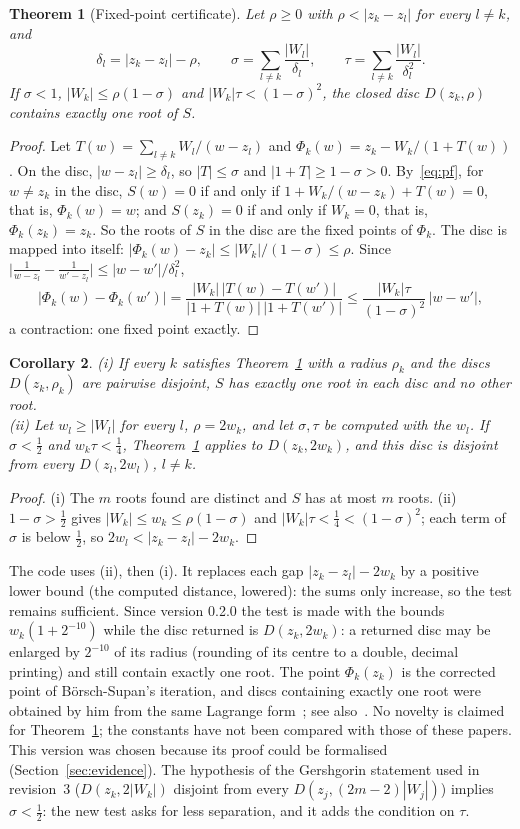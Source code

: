 \documentclass[10pt,a4paper]{article}
\newtheorem{theorem}{Theorem}[section]
\newtheorem{corollary}[theorem]{Corollary}
\theoremstyle{definition}
\numberwithin{equation}{section}
\begin{document}
\begin{theorem}[Fixed-point certificate]\label{thm:fp}
Let $\rho\ge0$ with $\rho<|z_k-z_l|$ for every $l\ne k$, and
\[
\delta_l=|z_k-z_l|-\rho,\qquad\sigma=\sum_{l\ne k}\frac{|W_l|}{\delta_l},\qquad
\tau=\sum_{l\ne k}\frac{|W_l|}{\delta_l^2}.
\]
If $\sigma<1$, $|W_k|\le\rho(1-\sigma)$ and $|W_k|\tau<(1-\sigma)^2$, the closed disc $D(z_k,\rho)$
contains exactly one root of $S$.
\end{theorem}
\begin{proof}
Let $T(w)=\sum_{l\ne k}W_l/(w-z_l)$ and $\Phi_k(w)=z_k-W_k/(1+T(w))$. On the disc, $|w-z_l|\ge\delta_l$,
so $|T|\le\sigma$ and $|1+T|\ge1-\sigma>0$. By~\eqref{eq:pf}, for $w\ne z_k$ in the disc, $S(w)=0$ if
and only if $1+W_k/(w-z_k)+T(w)=0$, that is, $\Phi_k(w)=w$; and $S(z_k)=0$ if and only if $W_k=0$,
that is, $\Phi_k(z_k)=z_k$. So the roots of $S$ in the disc are the fixed points of $\Phi_k$. The disc
is mapped into itself: $|\Phi_k(w)-z_k|\le|W_k|/(1-\sigma)\le\rho$. Since
$\bigl|\frac1{w-z_l}-\frac1{w'-z_l}\bigr|\le|w-w'|/\delta_l^2$,
\[
|\Phi_k(w)-\Phi_k(w')|=\frac{|W_k|\,|T(w)-T(w')|}{|1+T(w)|\,|1+T(w')|}\le\frac{|W_k|\tau}{(1-\sigma)^2}\,|w-w'|,
\]
a contraction: one fixed point exactly.
\end{proof}
\begin{corollary}\label{cor:fp}
(i) If every $k$ satisfies Theorem~\ref{thm:fp} with a radius $\rho_k$ and the discs $D(z_k,\rho_k)$
are pairwise disjoint, $S$ has exactly one root in each disc and no other root.\\
(ii) Let $w_l\ge|W_l|$ for every $l$, $\rho=2w_k$, and let $\sigma,\tau$ be computed with the $w_l$.
If $\sigma<\frac12$ and $w_k\tau<\frac14$, Theorem~\ref{thm:fp} applies to $D(z_k,2w_k)$, and this disc
is disjoint from every $D(z_l,2w_l)$, $l\ne k$.
\end{corollary}
\begin{proof}
(i) The $m$ roots found are distinct and $S$ has at most $m$ roots. (ii) $1-\sigma>\frac12$ gives
$|W_k|\le w_k\le\rho(1-\sigma)$ and $|W_k|\tau<\frac14<(1-\sigma)^2$; each term of $\sigma$ is below
$\frac12$, so $2w_l<|z_k-z_l|-2w_k$.
\end{proof}
The code uses (ii), then (i). It replaces each gap $|z_k-z_l|-2w_k$ by a positive lower bound
(the computed distance, lowered): the sums only increase, so the test remains sufficient. Since
version 0.2.0 the test is made with the bounds $w_k(1+2^{-10})$ while the disc returned is
$D(z_k,2w_k)$: a returned disc may be enlarged by $2^{-10}$ of its radius (rounding of its centre to a
double, decimal printing) and still contain exactly one root. The point $\Phi_k(z_k)$ is the corrected point of
B\"orsch-Supan's iteration, and discs containing exactly one root were obtained by him from the same
Lagrange form~\cite{bs}; see also~\cite{bh}. No novelty is claimed for Theorem~\ref{thm:fp}; the constants
have not been compared with those of these papers. This version was chosen because its proof could be
formalised (Section~\ref{sec:evidence}). The hypothesis of the Gershgorin statement used in
revision~3 ($D(z_k,2|W_k|)$ disjoint from every $D(z_j,(2m-2)|W_j|)$) implies $\sigma<\frac12$: the
new test asks for less separation, and it adds the condition on $\tau$.
\end{document}
